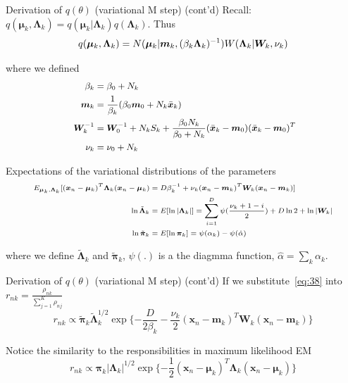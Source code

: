 \documentclass[10pt,mathserif]{beamer}
\begin{document}
\begin{frame}{Derivation of $q(\theta)$ (variational M step) (cont'd)}
Recall: $q (\bm{\mu}_k,\bm{\Lambda}_k) = q (\bm{\mu}_k|\bm{\Lambda}_k)q (\bm{\Lambda}_k)$. Thus
\begin{equation}\small
    q(\bm{\mu}_k, \bm{\Lambda}_k) = N (\bm{\mu}_k|\bm{m}_k, (\beta_k\bm{\Lambda}_k)^{-1}) W(\bm{\Lambda}_k|\bm{W}_k, \nu_k)
\end{equation}

where we defined
\begin{equation}\small~\label{eq:37}
    \begin{split}
        \beta_k & = \beta_0+N_k\\
        \bm{m}_k & = \frac{1}{\beta_k} (\beta_0\bm{m}_0 +N_k \bar{\bm{x}}_k)\\
        \bm{W}_k^{-1} & = \bm{W}_0^{-1}+N_k S_k + \frac{\beta_0 N_k}{\beta_0 + N_k}(\bar{\bm{x}}_k - \bm{m}_0)(\bar{\bm{x}}_k - \bm{m}_0)^T\\
        \nu_k & = \nu_0+N_k
    \end{split}
\end{equation}

Expectations of the variational distributions of the parameters
\begin{equation}\label{eq:38}\scriptsize
    \begin{split}
        E_{\bm{\mu}_k,\bm{\Lambda}_k} [(\bm{x}_n - \bm{\mu}_k)^T\bm{\Lambda}_k(\bm{x}_n - \bm{\mu}_k) & =  D\beta_k^{-1} + \nu_k(\bm{x}_n - \bm{m}_k)^T \bm{W}_k(\bm{x}_n - \bm{m}_k)] \\
        \ln\tilde{\bm{\Lambda}}_k & = E[\ln |\bm{\Lambda}_k|] = \sum_{i=1}^D \psi (\frac{\nu_k + 1 -i}{2}) + D\ln2 + \ln|\bm{W}_k|\\
        \ln\tilde{\bm{\pi}}_k & = E[\ln\bm{\pi}_k] = \psi(\alpha_k) - \psi(\hat{\alpha})
    \end{split}
\end{equation}

where we define $\tilde{\bm{\Lambda}}_k$ and $\tilde{\bm{\pi}}_k$, $\psi(.)$ is a the diagmma function, $\hat{\alpha} = \sum_k\alpha_k$.
\end{frame}

\begin{frame}{Derivation of $q(\theta)$ (variational M step) (cont'd)}
If we substitute~\eqref{eq:38} into $r_{nk} = \frac{\rho_{nk}}{\sum_{j=1}^K \rho_{nj}}$
\begin{equation}
    r_{nk} \propto \tilde{\bm{\pi}}_k \tilde{\bm{\Lambda}}_k^{1/2}\exp\{-\frac{D}{2\beta_k}-\frac{\nu_k}{2}(\bm{x}_n - \bm{m}_k)^T \bm{W}_k (\bm{x}_n - \bm{m}_k) \}
\end{equation}

Notice the similarity to the responsibilities in maximum likelihood EM
\begin{equation}
    r_{nk} \propto \bm{\pi}_k |\bm{\Lambda}_k|^{1/2}\exp\{-\frac{1}{2}(\bm{x}_n - \bm{\mu}_k)^T \bm{\Lambda}_k (\bm{x}_n - \bm{\mu}_k) \}
\end{equation}
\end{frame}
\end{document}
